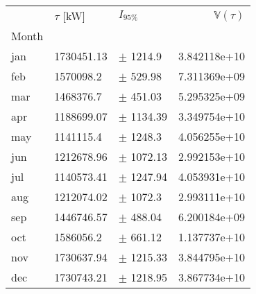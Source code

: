 \begin{tabular}{lllr}
\toprule
{} & $\tau$ [kW] &     $I_{95\%}$ &  $\mathbb{V}(\tau)$ \\
Month &             &                &                     \\
\midrule
jan   &  1730451.13 &   $\pm$ 1214.9 &        3.842118e+10 \\
feb   &   1570098.2 &   $\pm$ 529.98 &        7.311369e+09 \\
mar   &   1468376.7 &   $\pm$ 451.03 &        5.295325e+09 \\
apr   &  1188699.07 &  $\pm$ 1134.39 &        3.349754e+10 \\
may   &   1141115.4 &   $\pm$ 1248.3 &        4.056255e+10 \\
jun   &  1212678.96 &  $\pm$ 1072.13 &        2.992153e+10 \\
jul   &  1140573.41 &  $\pm$ 1247.94 &        4.053931e+10 \\
aug   &  1212074.02 &   $\pm$ 1072.3 &        2.993111e+10 \\
sep   &  1446746.57 &   $\pm$ 488.04 &        6.200184e+09 \\
oct   &   1586056.2 &   $\pm$ 661.12 &        1.137737e+10 \\
nov   &  1730637.94 &  $\pm$ 1215.33 &        3.844795e+10 \\
dec   &  1730743.21 &  $\pm$ 1218.95 &        3.867734e+10 \\
\bottomrule
\end{tabular}
